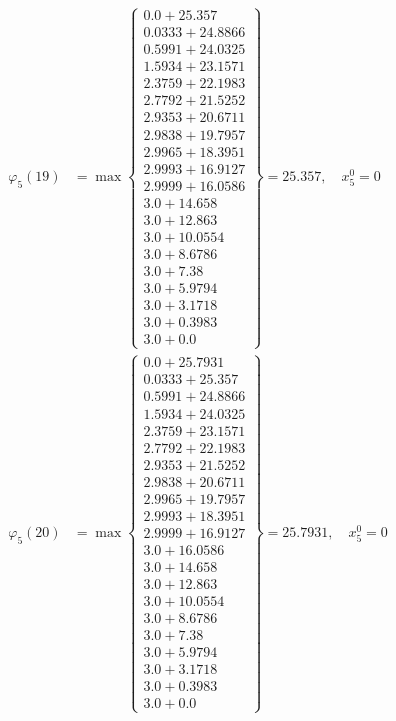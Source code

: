 \documentclass{article}
\begin{document}
\begin{align*}
  
  
  
\varphi_{5}(19) &= \max \left\{ \begin{array}{c}
0.0 + 25.357 \\
 0.0333 + 24.8866 \\
 0.5991 + 24.0325 \\
 1.5934 + 23.1571 \\
 2.3759 + 22.1983 \\
 2.7792 + 21.5252 \\
 2.9353 + 20.6711 \\
 2.9838 + 19.7957 \\
 2.9965 + 18.3951 \\
 2.9993 + 16.9127 \\
 2.9999 + 16.0586 \\
 3.0 + 14.658 \\
 3.0 + 12.863 \\
 3.0 + 10.0554 \\
 3.0 + 8.6786 \\
 3.0 + 7.38 \\
 3.0 + 5.9794 \\
 3.0 + 3.1718 \\
 3.0 + 0.3983 \\
 3.0 + 0.0
\end{array} \right\}=25.357,\quad x_{5}^0=0\\
  
  
  
  
\varphi_{5}(20) &= \max \left\{ \begin{array}{c}
0.0 + 25.7931 \\
 0.0333 + 25.357 \\
 0.5991 + 24.8866 \\
 1.5934 + 24.0325 \\
 2.3759 + 23.1571 \\
 2.7792 + 22.1983 \\
 2.9353 + 21.5252 \\
 2.9838 + 20.6711 \\
 2.9965 + 19.7957 \\
 2.9993 + 18.3951 \\
 2.9999 + 16.9127 \\
 3.0 + 16.0586 \\
 3.0 + 14.658 \\
 3.0 + 12.863 \\
 3.0 + 10.0554 \\
 3.0 + 8.6786 \\
 3.0 + 7.38 \\
 3.0 + 5.9794 \\
 3.0 + 3.1718 \\
 3.0 + 0.3983 \\
 3.0 + 0.0
\end{array} \right\}=25.7931,\quad x_{5}^0=0\\
  

\end{align*}
\end{document}
